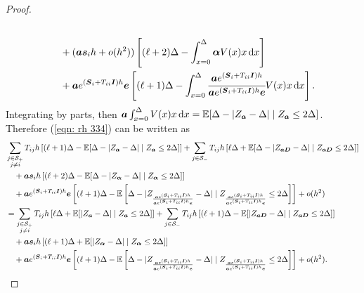 \begin{proof}
\begin{align}
		\\&\qquad{} + (\boldsymbol a \boldsymbol s_i h + o(h^2)) \left[ (\ell+2)\Delta - \int_{x=0}^\Delta \boldsymbol \alpha V(x) x \, \mathrm{d} x\right] \nonumber
		\\&\qquad{} + \boldsymbol a e^{(\boldsymbol S_i + T_{ii}\boldsymbol I)h}\boldsymbol e \left[ (\ell+1)\Delta - \int_{x=0}^\Delta \cfrac{\boldsymbol a e^{(\boldsymbol S_i + T_{ii}\boldsymbol I)h}}{\boldsymbol a e^{(\boldsymbol S_i + T_{ii}\boldsymbol I)h} \boldsymbol e} V(x) x \, \mathrm{d} x\right]. \label{eqn: rh 334}
	\end{align}
	Integrating by parts, then \(\boldsymbol a \int_{x=0}^\Delta V(x) x \, \mathrm{d} x = \mathbb E[\Delta - |Z_{\boldsymbol a}-\Delta|\mid Z_{\boldsymbol a}\leq 2\Delta]\). Therefore (\ref{eqn: rh 334}) can be written as 
	\begin{align}
		&\sum_{\substack{j\in\mathcal S_+\\j\neq i}}T_{ij}h \left[ (\ell+1)\Delta - \mathbb E[\Delta - |Z_{\boldsymbol a}-\Delta|\mid Z_{\boldsymbol a}\leq 2\Delta] \right] \nonumber 
		+ \sum_{j\in\mathcal S_-}T_{ij}h \left[ \ell\Delta + \mathbb E[\Delta - |Z_{\boldsymbol a\boldsymbol D}-\Delta|\mid Z_{\boldsymbol a\boldsymbol D}\leq 2\Delta]\right] \nonumber
		\\&\quad {} + \boldsymbol a \boldsymbol s_i h \left[ (\ell+2)\Delta - \mathbb E[\Delta - |Z_{\boldsymbol \alpha}-\Delta|\mid Z_{\boldsymbol \alpha}\leq 2\Delta]\right] \nonumber
		\\&\quad{} + \boldsymbol a e^{(\boldsymbol S_i + T_{ii}\boldsymbol I)h}\boldsymbol e \left[ (\ell+1)\Delta - \mathbb E\left[\Delta - |Z_{\frac{\boldsymbol a e^{(\boldsymbol S_i + T_{ii}\boldsymbol I)h}}{\boldsymbol a e^{(\boldsymbol S_i + T_{ii}\boldsymbol I)h}\boldsymbol e}}-\Delta|\mid Z_{\frac{\boldsymbol a e^{(\boldsymbol S_i + T_{ii}\boldsymbol I)h}}{\boldsymbol a e^{(\boldsymbol S_i + T_{ii}\boldsymbol I)h}\boldsymbol e}}\leq 2\Delta\right] \right] + o(h^2)
		\\&= \sum_{\substack{j\in\mathcal S_+\\j\neq i}}T_{ij}h \left[ \ell\Delta + \mathbb E[  |Z_{\boldsymbol a}-\Delta|\mid Z_{\boldsymbol a}\leq 2\Delta] \right] \nonumber 
		+ \sum_{j\in\mathcal S_-}T_{ij}h \left[ (\ell+1)\Delta - \mathbb E[ |Z_{\boldsymbol a\boldsymbol D}-\Delta|\mid Z_{\boldsymbol a\boldsymbol D}\leq 2\Delta]\right] \nonumber
		\\&\quad {} + \boldsymbol a \boldsymbol s_i h \left[ (\ell+1)\Delta + \mathbb E[|Z_{\boldsymbol \alpha}-\Delta|\mid Z_{\boldsymbol \alpha}\leq 2\Delta]\right] \nonumber
		\\&\quad{} + \boldsymbol a e^{(\boldsymbol S_i + T_{ii}\boldsymbol I)h}\boldsymbol e \left[ (\ell+1)\Delta - \mathbb E\left[\Delta - |Z_{\frac{\boldsymbol a e^{(\boldsymbol S_i + T_{ii}\boldsymbol I)h}}{\boldsymbol a e^{(\boldsymbol S_i + T_{ii}\boldsymbol I)h}\boldsymbol e}}-\Delta|\mid Z_{\frac{\boldsymbol a e^{(\boldsymbol S_i + T_{ii}\boldsymbol I)h}}{\boldsymbol a e^{(\boldsymbol S_i + T_{ii}\boldsymbol I)h}\boldsymbol e}}\leq 2\Delta\right] \right] + o(h^2).
	\end{align}

\end{proof}

